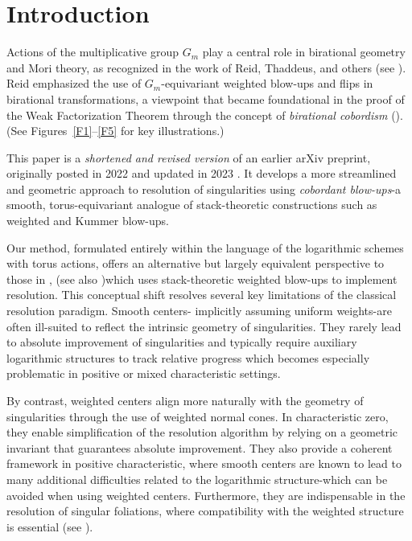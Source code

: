 \documentclass{amsart}
\begin{document}
\section{Introduction}
Actions of the multiplicative group \( G_m \) play a central role in birational geometry and Mori theory, as recognized in the work of Reid, Thaddeus, and others (see \cite{Tha1, Tha2, Tha3, Reid92, DH98}). Reid \cite{Reid02} emphasized the use of \( G_m \)-equivariant weighted blow-ups and flips in birational transformations, a viewpoint that became foundational in the proof of the Weak Factorization Theorem through the concept of \emph{birational cobordism} (\cite{W-Cobordism, W-Factor, AKMW}). (See Figures~\ref{F1}--\ref{F5} for key illustrations.)

This paper is a \emph{shortened and revised version} of an earlier arXiv preprint, originally posted in 2022 \cite{W22} and updated in 2023 \cite{W23}. It develops a more streamlined and geometric approach to resolution of singularities using \emph{cobordant blow-ups}-a smooth, torus-equivariant analogue of stack-theoretic constructions such as weighted and Kummer blow-ups.

Our method, formulated entirely within the language of the logarithmic schemes with torus actions, offers an alternative but largely equivalent perspective to those in \cite{Marzo-McQuillan,ATW-weighted}, (see also \cite{ATW-principalization, ATW-relative,Quek} )which uses stack-theoretic weighted blow-ups to implement resolution. This  conceptual shift resolves several key limitations of the classical resolution paradigm. Smooth centers- implicitly assuming uniform weights-are often ill-suited to reflect the intrinsic geometry of singularities. They rarely lead to absolute improvement of singularities and typically require auxiliary logarithmic structures to track relative progress which becomes especially problematic in positive or mixed characteristic settings.


By contrast, weighted centers align more naturally with the geometry of singularities through the use of weighted normal cones. In characteristic zero, they enable simplification of the resolution algorithm by relying on a geometric invariant that guarantees absolute improvement. They also provide a coherent framework in positive characteristic, where smooth centers are known to lead to many additional difficulties related to the logarithmic structure-which can be avoided when using weighted centers. Furthermore, they are indispensable in the resolution of singular foliations, where compatibility with the weighted structure is essential (see \cite{Panazzolo}).
\end{document}
